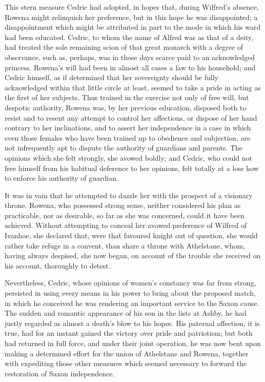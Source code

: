 This stern measure Cedric had adopted, in hopes that, during Wilfred's
absence, Rowena might relinquish her preference, but in this hope he was
disappointed; a disappointment which might be attributed in part to the
mode in which his ward had been educated. Cedric, to whom the name of
Alfred was as that of a deity, had treated the sole remaining scion of
that great monarch with a degree of observance, such as, perhaps, was in
those days scarce paid to an acknowledged princess. Rowena's will had
been in almost all cases a law to his household; and Cedric himself, as
if determined that her sovereignty should be fully acknowledged within
that little circle at least, seemed to take a pride in acting as the
first of her subjects. Thus trained in the exercise not only of free
will, but despotic authority, Rowena was, by her previous education,
disposed both to resist and to resent any attempt to control her
affections, or dispose of her hand contrary to her inclinations, and to
assert her independence in a case in which even those females who have
been trained up to obedience and subjection, are not infrequently apt to
dispute the authority of guardians and parents. The opinions which she
felt strongly, she avowed boldly; and Cedric, who could not free himself
from his habitual deference to her opinions, felt totally at a loss how
to enforce his authority of guardian.

It was in vain that he attempted to dazzle her with the prospect of a
visionary throne. Rowena, who possessed strong sense, neither considered
his plan as practicable, nor as desirable, so far as she was concerned,
could it have been achieved. Without attempting to conceal her avowed
preference of Wilfred of Ivanhoe, she declared that, were that favoured
knight out of question, she would rather take refuge in a convent, than
share a throne with Athelstane, whom, having always despised, she now
began, on account of the trouble she received on his account, thoroughly
to detest.

Nevertheless, Cedric, whose opinions of women's constancy was far from
strong, persisted in using every means in his power to bring about the
proposed match, in which he conceived he was rendering an important
service to the Saxon cause. The sudden and romantic appearance of his
son in the lists at Ashby, he had justly regarded as almost a death's
blow to his hopes. His paternal affection, it is true, had for an
instant gained the victory over pride and patriotism; but both had
returned in full force, and under their joint operation, he was now bent
upon making a determined effort for the union of Athelstane and Rowena,
together with expediting those other measures which seemed necessary to
forward the restoration of Saxon independence.

